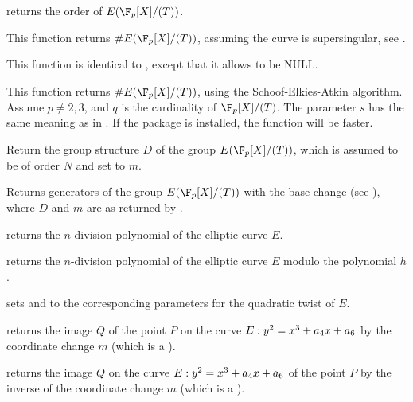 returns the order of $E(\F_p[X]/(T))$.

This function returns $\#E(\F_p[X]/(T))$, assuming the curve is
supersingular, see .

This function is identical to
, except that it allows  to be {NULL}.

This function returns $\#E(\F_p[X]/(T))$, using the Schoof-Elkies-Atkin
algorithm.
Assume $p\neq 2,3$, and $q$ is the cardinality of $\F_p[X]/(T)$.
The parameter $s$ has the same meaning as in .
If the  package is installed, the function will be faster.

Return the group structure $D$ of the group $E(\F_p[X]/(T))$,
which is assumed to be of order $N$ and set  to $m$.

Returns generators of the group $E(\F_p[X]/(T))$ with the base change 
(see ), where $D$ and $m$ are as returned by
.

 returns the
$n$-division polynomial of the elliptic curve $E$.

returns the $n$-division polynomial of the elliptic curve $E$ modulo the
polynomial $h$.

sets  and  to the corresponding parameters for the
quadratic twist of $E$.


 returns the
image $Q$ of the point $P$ on the curve $E:y^2=x^3+a_4\*x+a_6$ by the
coordinate change $m$ (which is a ).

 returns
the image $Q$ on the curve $E:y^2=x^3+a_4\*x+a_6$ of the point $P$ by the
inverse of the coordinate change $m$ (which is a ).

